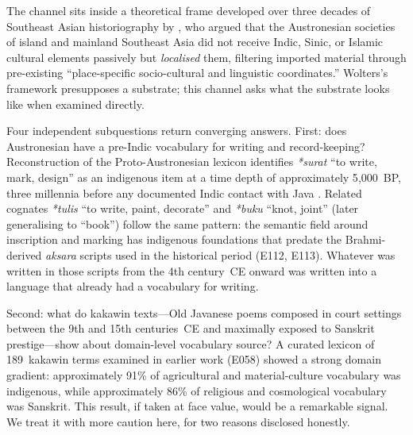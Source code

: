 \documentclass[12pt,a4paper]{article}
\begin{document}
The channel sits inside a theoretical frame developed over three decades of Southeast Asian historiography by \citet{wolters1999}, who argued that the Austronesian societies of island and mainland Southeast Asia did not receive Indic, Sinic, or Islamic cultural elements passively but \textit{localised} them, filtering imported material through pre-existing ``place-specific socio-cultural and linguistic coordinates.'' Wolters's framework presupposes a substrate; this channel asks what the substrate looks like when examined directly.

Four independent subquestions return converging answers. First: does Austronesian have a pre-Indic vocabulary for writing and record-keeping? Reconstruction of the Proto-Austronesian lexicon identifies \textit{*surat} ``to write, mark, design'' as an indigenous item at a time depth of approximately 5{,}000~BP, three millennia before any documented Indic contact with Java \citep{blust2009acd}. Related cognates \textit{*tulis} ``to write, paint, decorate'' and \textit{*buku} ``knot, joint'' (later generalising to ``book'') follow the same pattern: the semantic field around inscription and marking has indigenous foundations that predate the Brahmi-derived \textit{aksara} scripts used in the historical period (E112, E113). Whatever was written in those scripts from the 4th century~CE onward was written into a language that already had a vocabulary for writing.

Second: what do kakawin texts---Old Javanese poems composed in court settings between the 9th and 15th centuries~CE and maximally exposed to Sanskrit prestige---show about domain-level vocabulary source? A curated lexicon of 189~kakawin terms examined in earlier work (E058) showed a strong domain gradient: approximately 91\% of agricultural and material-culture vocabulary was indigenous, while approximately 86\% of religious and cosmological vocabulary was Sanskrit. This result, if taken at face value, would be a remarkable signal. We treat it with more caution here, for two reasons disclosed honestly.
\end{document}
